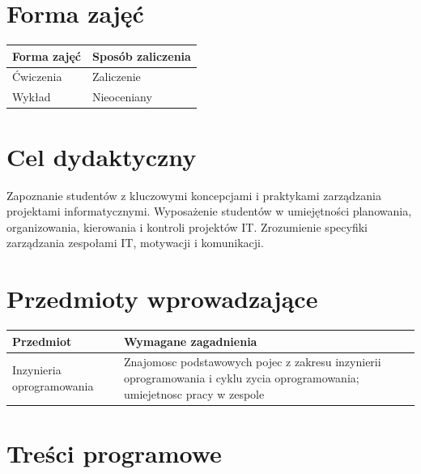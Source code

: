 \documentclass[12pt, a4paper]{article}
\begin{document}
\section{Forma zajęć}

\begin{tabular}{ll}
  \hline
  \textbf{Forma zajęć} & \textbf{Sposób zaliczenia} \\
  \hline
  Ćwiczenia & Zaliczenie \\
  Wykład & Nieoceniany \\
  \hline
\end{tabular}

\section{Cel dydaktyczny}

Zapoznanie studentów z kluczowymi koncepcjami i praktykami zarządzania projektami informatycznymi. Wyposażenie studentów w umiejętności planowania, organizowania, kierowania i kontroli projektów IT. Zrozumienie specyfiki zarządzania zespołami IT, motywacji i komunikacji.

\section{Przedmioty wprowadzające}

\begin{tabularx}{\textwidth}{lX}
  \hline
  \textbf{Przedmiot} & \textbf{Wymagane zagadnienia} \\
  \hline
  Inzynieria oprogramowania & Znajomosc podstawowych pojec z zakresu inzynierii oprogramowania i cyklu zycia oprogramowania; umiejetnosc pracy w zespole \\
  \hline
\end{tabularx}

\section{Treści programowe}
\end{document}
